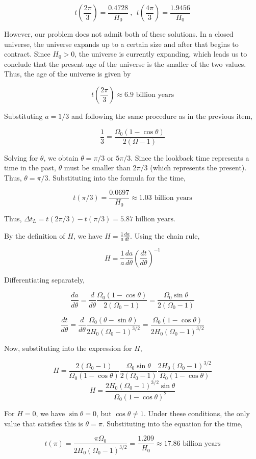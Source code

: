 \documentclass[11pt]{article}
\begin{document}
\begin{pproblem}
\begin{pssolution*}{}{}
\begin{alternativas}
        \[t\left(\frac{2\pi}{3}\right) = \frac{0.4728}{H_0} \ , \ \ t\left(\frac{4\pi}{3}\right) = \frac{1.9456}{H_0}\]

        However, our problem does not admit both of these solutions. In a closed universe, the universe expands up to a certain size and after that begins to contract. Since \(H_0>0\), the universe is currently expanding, which leads us to conclude that the present age of the universe is the smaller of the two values. Thus, the age of the universe is given by

        \[\boxed{t\left(\frac{2\pi}{3}\right)\approx 6.9 \text{ billion years}}\]

        \item Substituting \(a=1/3\) and following the same procedure as in the previous item,
        
        \[\frac{1}{3} = \frac{\Omega_0(1-\cos\theta)}{2(\Omega-1)}\]

        Solving for \(\theta\), we obtain \(\theta = \pi/3 \) or \(5\pi/3\). Since the lookback time represents a time in the past, \(\theta\) must be smaller than \(2\pi/3\) (which represents the present). Thus, \(\theta = \pi/3\). Substituting into the formula for the time,

        \[t(\pi/3) = \frac{0.0697}{H_0} \approx 1.03 \text{ billion years}\]

        Thus, \(\boxed{\Delta t_L = t(2\pi/3) - t(\pi/3) = 5.87 \text{ billion years.}}\)

        \item By the definition of \(H\), we have \(H = \frac{1}{a}\frac{da}{dt}\). Using the chain rule,
        
        \[H = \frac{1}{a}\frac{d a}{d\theta}\left(\frac{dt}{d\theta}\right)^{-1}\]

        Differentiating separately,

        \[\frac{da}{d\theta} = \frac{d}{d\theta}\frac{\Omega_0(1-\cos\theta)}{2(\Omega_0-1)} = \frac{\Omega_0\sin\theta}{2(\Omega_0-1)}\]

        \[\frac{dt}{d\theta} = \frac{d}{d\theta}\frac{\Omega_0(\theta-\sin\theta)}{2H_0(\Omega_0-1)^{3/2}} = \frac{\Omega_0(1-\cos\theta)}{2H_0(\Omega_0-1)^{3/2}}\]

        Now, substituting into the expression for \(H\),

        \[H = \frac{2(\Omega_0-1)}{\Omega_0(1-\cos\theta)}\frac{\Omega_0\sin\theta}{2(\Omega_0-1)}\frac{2H_0(\Omega_0-1)^{3/2}}{\Omega_0(1-\cos\theta)}\]
        \[H = \frac{2H_0(\Omega_0-1)^{3/2}\sin\theta}{\Omega_0(1-\cos\theta)^2}\]

        For \(H=0\), we have \(\sin\theta = 0\), but \(\cos\theta \ne 1\). Under these conditions, the only value that satisfies this is \(\boxed{\theta = \pi}\). Substituting into the equation for the time,

        \[\boxed{t(\pi) = \frac{\pi\Omega_0}{2H_0(\Omega_0-1)^{3/2}}= \frac{1.209}{H_0} \approx 17.86 \text{ billion years}}\]

    \end{alternativas}
\end{pssolution*}
\end{pproblem}
\end{document}

